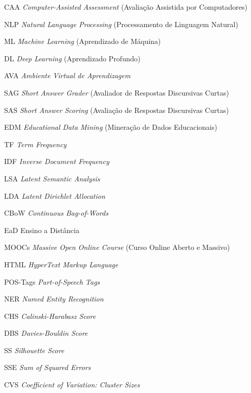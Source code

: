 \documentclass[
	12pt,				%
	openright,			%
	twoside,			%
	a4paper,			%
	english,			%
	french,				%
	spanish,			%
	brazil				%
	]{abntex2}
\begin{document}
\listoffigures*
\cleardoublepage

\listoftables*
\cleardoublepage

\begin{siglas}
  \item[CAA] \textit{Computer-Assisted Assessment} (Avaliação Assistida por Computadores)
  \item[NLP] \textit{Natural Language Processing} (Processamento de Linguagem Natural)
  \item[ML] \textit{Machine Learning} (Aprendizado de Máquina)
  \item[DL] \textit{Deep Learning} (Aprendizado Profundo)
  \item[AVA] \textit{Ambiente Virtual de Aprendizagem}
  \item[SAG] \textit{Short Answer Grader} (Avaliador de Respostas Discursivas Curtas)
  \item[SAS] \textit{Short Answer Scoring} (Avaliação de Respostas Discursivas Curtas)
  \item[EDM] \textit{Educational Data Mining} (Mineração de Dados Educacionais)
  \item[TF] \textit{Term Frequency}
  \item[IDF] \textit{Inverse Document Frequency}
  \item[LSA] \textit{Latent Semantic Analysis} 
  \item[LDA] \textit{Latent Dirichlet Allocation}
  \item[CBoW] \textit{Continuous Bag-of-Words}
  \item[EaD] Ensino a Distância
  \item[MOOCs] \textit{Massive Open Online Course} (Curso Online Aberto e Massivo)
  \item[HTML] \textit{HyperText Markup Language}
  \item[POS-Tags] \textit{Part-of-Speech Tags}
  \item[NER] \textit{Named Entity Recognition}
  \item[CHS] \textit{Calinski-Harabasz Score}
  \item[DBS] \textit{Davies-Bouldin Score}
  \item[SS] \textit{Silhouette Score}
  \item[SSE] \textit{Sum of Squared Errors}
  \item[CVS] \textit{Coefficient of Variation: Cluster Sizes}

\end{siglas}
\end{document}
